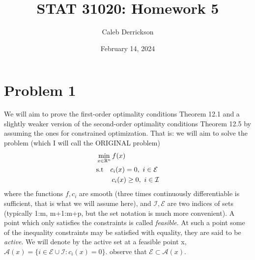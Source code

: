 

\title{STAT 31020: Homework 5}
\author{Caleb Derrickson}
\date{February 14, 2024}


\onehalfspacing
\maketitle
\allowdisplaybreaks

\tableofcontents

\newcommand{\scI}{\mathcal{I}}
\newcommand{\scE}{\mathcal{E}}
\newcommand{\scA}{\mathcal{A}}
\newcommand{\scL}{\mathcal{L}}
\newcommand{\scF}{\mathcal{F}}
\renewcommand{\grad}{\nabla}

\newpage
\section{Problem 1}
We will aim to prove the first-order optimality conditions Theorem 12.1 and a slightly weaker version of the second-order optimality conditions Theorem 12.5 by assuming the ones for constrained optimization. That is: we will aim to solve the problem (which I will call the ORIGINAL problem) 
\begin{align}
    &\min_{x \in \R^n} f(x)\label{original}\\ &\text{s.t} \quad c_i(x) = 0, \ i \in \scE \nonumber\\
    &\hspace{8mm} c_i(x) \geq 0, \ i \in \scI\nonumber
\end{align}
where the functions $f, c_i$ are smooth (three times continuously differentiable is sufficient, that is what we will assume here), and $ \scI, \scE$ are two indices of sets (typically 1:m, m+1:m+p, but the set notation is much more convenient). A point which only satisfies the constraints is called \textit{feasible}. At such a point some of the inequality constraints may be satisfied with equality, they are said to be \textit{active}. We will denote by the active set at a feasible point x, $\scA (x) = \{ i \in \scE \cup \scI : c_i(x) = 0\}$. observe that $\scE \subset \scA(x)$. \par


